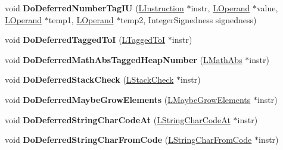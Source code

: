 \begin{DoxyCompactItemize}
\item 
void {\bfseries Do\+Deferred\+Number\+Tag\+IU} (\hyperlink{classv8_1_1internal_1_1_l_instruction}{L\+Instruction} $\ast$instr, \hyperlink{classv8_1_1internal_1_1_l_operand}{L\+Operand} $\ast$value, \hyperlink{classv8_1_1internal_1_1_l_operand}{L\+Operand} $\ast$temp1, \hyperlink{classv8_1_1internal_1_1_l_operand}{L\+Operand} $\ast$temp2, Integer\+Signedness signedness)\hypertarget{classv8_1_1internal_1_1_l_code_gen_a81fedc95085cf988c8e3d548e1c9a5f1}{}\label{classv8_1_1internal_1_1_l_code_gen_a81fedc95085cf988c8e3d548e1c9a5f1}

\item 
void {\bfseries Do\+Deferred\+Tagged\+ToI} (\hyperlink{classv8_1_1internal_1_1_l_tagged_to_i}{L\+Tagged\+ToI} $\ast$instr)\hypertarget{classv8_1_1internal_1_1_l_code_gen_a64133c7509f54dc0bd30c3bbb07db4ad}{}\label{classv8_1_1internal_1_1_l_code_gen_a64133c7509f54dc0bd30c3bbb07db4ad}

\item 
void {\bfseries Do\+Deferred\+Math\+Abs\+Tagged\+Heap\+Number} (\hyperlink{classv8_1_1internal_1_1_l_math_abs}{L\+Math\+Abs} $\ast$instr)\hypertarget{classv8_1_1internal_1_1_l_code_gen_aa6e5b6dba176a4572ce81dcc27b057aa}{}\label{classv8_1_1internal_1_1_l_code_gen_aa6e5b6dba176a4572ce81dcc27b057aa}

\item 
void {\bfseries Do\+Deferred\+Stack\+Check} (\hyperlink{classv8_1_1internal_1_1_l_stack_check}{L\+Stack\+Check} $\ast$instr)\hypertarget{classv8_1_1internal_1_1_l_code_gen_a273730f2504ea249d9deb8dde7b314ee}{}\label{classv8_1_1internal_1_1_l_code_gen_a273730f2504ea249d9deb8dde7b314ee}

\item 
void {\bfseries Do\+Deferred\+Maybe\+Grow\+Elements} (\hyperlink{classv8_1_1internal_1_1_l_maybe_grow_elements}{L\+Maybe\+Grow\+Elements} $\ast$instr)\hypertarget{classv8_1_1internal_1_1_l_code_gen_afe319c35fc8adaff35f3417fb7c833d6}{}\label{classv8_1_1internal_1_1_l_code_gen_afe319c35fc8adaff35f3417fb7c833d6}

\item 
void {\bfseries Do\+Deferred\+String\+Char\+Code\+At} (\hyperlink{classv8_1_1internal_1_1_l_string_char_code_at}{L\+String\+Char\+Code\+At} $\ast$instr)\hypertarget{classv8_1_1internal_1_1_l_code_gen_a6b229168338a73ef11c203f845b68cb4}{}\label{classv8_1_1internal_1_1_l_code_gen_a6b229168338a73ef11c203f845b68cb4}

\item 
void {\bfseries Do\+Deferred\+String\+Char\+From\+Code} (\hyperlink{classv8_1_1internal_1_1_l_string_char_from_code}{L\+String\+Char\+From\+Code} $\ast$instr)\hypertarget{classv8_1_1internal_1_1_l_code_gen_acf78c92290237e368a4b178f049afbc6}{}\label{classv8_1_1internal_1_1_l_code_gen_acf78c92290237e368a4b178f049afbc6}


\end{DoxyCompactItemize}
